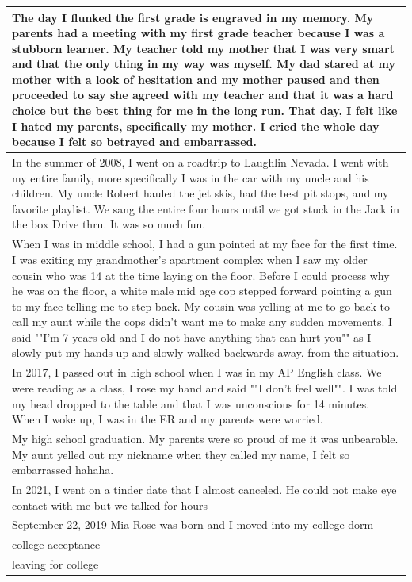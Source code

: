 \documentclass[
  .7em,
  letterpaper,
  DIV=11,
  numbers=noendperiod]{scrartcl}
\begin{document}
\begin{table}
\begin{tabular}{l}
\hline
The day I flunked the first grade is engraved in my memory. My parents had a meeting with my first grade teacher because I was a stubborn learner. My teacher told my mother that I was very smart and that the only thing in my way was myself. My dad stared at my mother with a look of hesitation and my mother paused and then proceeded to say she agreed with my teacher and that it was a hard choice but the best thing for me in the long run. That day, I felt like I hated my parents, specifically my mother. I cried the whole day because I felt so betrayed and embarrassed.\\
\hline
In the summer of 2008, I went on a roadtrip to Laughlin Nevada. I went with my entire family, more specifically I was in the car with my uncle and his children. My uncle Robert hauled the jet skis, had the best pit stops, and my favorite playlist. We sang the entire four hours until we got stuck in the Jack in the box Drive thru. It was so much fun.\\
\hline
When I was in middle school, I had a gun pointed at my face for the first time. I was exiting my grandmother's apartment complex when I saw my older cousin who was 14 at the time laying on the floor. Before I could process why he was on the floor, a white male mid age cop stepped forward pointing a gun to my face telling me to step back. My cousin was yelling at me to go back to call my aunt while the cops didn't want me to make any sudden movements. I said ""I'm 7 years old and I do not have anything that can hurt you"" as I slowly put my hands up and slowly walked backwards away. from the situation.\\
\hline
In 2017, I passed out in high school when I was in my AP English class. We were reading as a class, I rose my hand and said ""I don't feel well"". I was told my head dropped to the table and that I was unconscious for 14 minutes. When I woke up, I was in the ER and my parents were worried.\\
\hline
My high school graduation. My parents were so proud of me it was unbearable. My aunt yelled out my nickname when they called my name, I felt so embarrassed hahaha.\\
\hline
In 2021, I went on a tinder date that I almost canceled. He could not make eye contact with me but we talked for hours\\
\hline
September 22, 2019 Mia Rose was born and I moved into my college dorm\\
\hline
college acceptance\\
\hline
leaving for college\\

\end{tabular}
\end{table}
\end{document}
